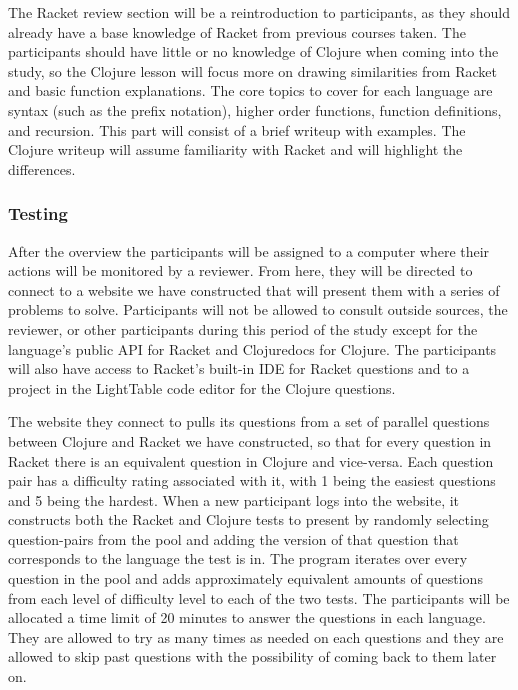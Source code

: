\documentclass[submission,copyright,creativecommons]{eptcs}
\begin{document}
The Racket review section will be a reintroduction to participants, as they should already have a base knowledge of Racket from previous courses taken.
The participants should have little or no knowledge of Clojure when coming into the study, so the Clojure lesson will focus more on drawing similarities from Racket and basic function explanations.
The core topics to cover for each language are syntax (such as the prefix notation), higher order functions, function definitions, and recursion.
This part will consist of a brief writeup with examples. The Clojure writeup will assume familiarity with Racket and will highlight the differences. 

\subsubsection{Testing}\label{subsec:testing}

After the overview the participants will be assigned to a computer where their actions will be monitored by a reviewer. 
From here, they will be directed to connect to a website we have constructed that will present them with a series of problems to solve. 
Participants will not be allowed to consult outside sources, the reviewer, or other participants during this period of the study except for the language's public API for Racket and Clojuredocs for Clojure.
The participants will also have access to Racket's built-in IDE for Racket questions and to a project in the LightTable code editor for the Clojure questions. 

The website they connect to pulls its questions from a set of parallel questions between Clojure and Racket we have constructed, so that for every question in Racket there is an equivalent question in Clojure and vice-versa.
Each question pair has a difficulty rating associated with it, with 1 being the easiest questions and 5 being the hardest.
When a new participant logs into the website, it constructs both the Racket and Clojure tests to present by randomly selecting question-pairs from the pool and adding the version of that question that corresponds to the language the test is in. 
The program iterates over every question in the pool and adds approximately equivalent amounts of questions from each level of difficulty level to each of the two tests.
	The participants will be allocated a time limit of 20 minutes to answer the questions in each language. 
They are allowed to try as many times as needed on each questions and they are allowed to skip past questions with the possibility of coming back to them later on. 
\end{document}
